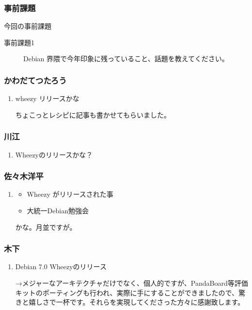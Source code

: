 \documentclass[cjk,dvipdfmx,10pt,compress,%
hyperref={bookmarks=true,bookmarksnumbered=true,bookmarksopen=false,%
colorlinks=false,%
pdftitle={第 79 回 関西 Debian 勉強会},%
pdfauthor={倉敷・のがた・佐々木・かわだ・八津尾},%
pdfsubject={資料},%
}]{beamer}
\begin{document}

\begin{frame}[fragile]
  \frametitle{事前課題}
  \begin{block}{今回の事前課題}
    \begin{description}
    \item[事前課題1]
      Debian 界隈で今年印象に残っていること、話題を教えてください。
    \end{description}
  \end{block}
\end{frame}


\begin{frame}
  \frametitle{ かわだてつたろう }
  \begin{enumerate}
  \item wheezy リリースかな

    ちょこっとレシピに記事も書かせてもらいました。
  \end{enumerate}
\end{frame}

\begin{frame}
  \frametitle{ 川江 }
  \begin{enumerate}
  \item Wheezyのリリースかな？
  \end{enumerate}
\end{frame}

\begin{frame}
  \frametitle{ 佐々木洋平 }
  \begin{enumerate}
  \item
    \begin{itemize}
    \item Wheezy がリリースされた事
    \item 大統一Debian勉強会
    \end{itemize}

    かな。月並ですが。
  \end{enumerate}
\end{frame}

\begin{frame}
  \frametitle{ 木下 }
  \begin{enumerate}
  \item Debian 7.0 Wheezyのリリース

    →メジャーなアーキテクチャだけでなく、個人的ですが、PandaBoard等評価キットのポーティングも行われ、実際に手にすることができましたので、驚きと嬉しさで一杯です。それらを実現してくださった方々に感謝致します。
  \end{enumerate}
\end{frame}
\end{document}
